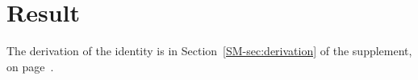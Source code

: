 \documentclass{article}
\begin{document}
\section{Result}\label{sec:result}
The derivation of the identity is in Section~\ref{SM-sec:derivation} of the
supplement, on page~\pageref{SM-sec:derivation}.
\end{document}
